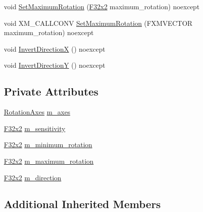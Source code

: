 \begin{DoxyCompactItemize}
\item 
void \hyperlink{classmage_1_1script_1_1_mouse_look_script_a878f1268e16f0af89d177fd026b18253}{Set\+Maximum\+Rotation} (\hyperlink{namespacemage_aa87237ad091f5cd7da612b8523fc108f}{F32x2} maximum\+\_\+rotation) noexcept
\item 
void X\+M\+\_\+\+C\+A\+L\+L\+C\+O\+NV \hyperlink{classmage_1_1script_1_1_mouse_look_script_a263e143e671ef56c04132b5e58d114a9}{Set\+Maximum\+Rotation} (F\+X\+M\+V\+E\+C\+T\+OR maximum\+\_\+rotation) noexcept
\item 
void \hyperlink{classmage_1_1script_1_1_mouse_look_script_aa527806c78873eab652dd6337a75b89f}{Invert\+DirectionX} () noexcept
\item 
void \hyperlink{classmage_1_1script_1_1_mouse_look_script_a189145ae96f56b805fe2020ed75db0bc}{Invert\+DirectionY} () noexcept
\end{DoxyCompactItemize}
\subsection*{Private Attributes}
\begin{DoxyCompactItemize}
\item 
\hyperlink{classmage_1_1script_1_1_mouse_look_script_aa8c8ce1a3e6ccefa7b8ddd31be209c23}{Rotation\+Axes} \hyperlink{classmage_1_1script_1_1_mouse_look_script_ae41f05d545c70cd621a405f6ef0cd4d5}{m\+\_\+axes}
\item 
\hyperlink{namespacemage_aa87237ad091f5cd7da612b8523fc108f}{F32x2} \hyperlink{classmage_1_1script_1_1_mouse_look_script_afe7a443c1fa56fc6143555f992458934}{m\+\_\+sensitivity}
\item 
\hyperlink{namespacemage_aa87237ad091f5cd7da612b8523fc108f}{F32x2} \hyperlink{classmage_1_1script_1_1_mouse_look_script_a4379e58bd89eab39d3e281133968a959}{m\+\_\+minimum\+\_\+rotation}
\item 
\hyperlink{namespacemage_aa87237ad091f5cd7da612b8523fc108f}{F32x2} \hyperlink{classmage_1_1script_1_1_mouse_look_script_ac3c7af839d88b3d9ec65250c41099c34}{m\+\_\+maximum\+\_\+rotation}
\item 
\hyperlink{namespacemage_aa87237ad091f5cd7da612b8523fc108f}{F32x2} \hyperlink{classmage_1_1script_1_1_mouse_look_script_a5f65024afe8940ca2709d5ee13dc033c}{m\+\_\+direction}
\end{DoxyCompactItemize}
\subsection*{Additional Inherited Members}


